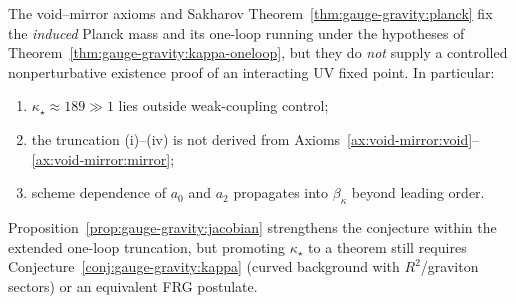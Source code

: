 \begin{proposition}
\label{prop:gauge-gravity:kappa-nogo}
The void--mirror axioms and Sakharov Theorem~\ref{thm:gauge-gravity:planck}
fix the \emph{induced} Planck mass and its one-loop running under the
hypotheses of Theorem~\ref{thm:gauge-gravity:kappa-oneloop}, but they do
\emph{not} supply a controlled nonperturbative existence proof of an
interacting UV fixed point. In particular:
\begin{enumerate}[label=(\roman*),leftmargin=*]
  \item $\kappa_\star\approx189\gg1$ lies outside weak-coupling control;
  \item the truncation (i)--(iv) is not derived from
    Axioms~\ref{ax:void-mirror:void}--\ref{ax:void-mirror:mirror};
  \item scheme dependence of $a_0$ and $a_2$ propagates into
    $\beta_\kappa$ beyond leading order.
\end{enumerate}
Proposition~\ref{prop:gauge-gravity:jacobian} strengthens the conjecture
within the extended one-loop truncation, but promoting $\kappa_\star$ to a
theorem still requires Conjecture~\ref{conj:gauge-gravity:kappa} (curved
background with $R^2$/graviton sectors) or an equivalent FRG postulate.
\end{proposition}